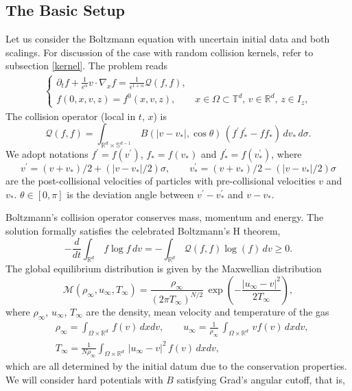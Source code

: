 \documentclass[final,onefignum,onetabnum]{siamart171218}
\begin{document}
\subsection{The Basic Setup}
\label{Section2}
Let us consider the Boltzmann equation with uncertain initial data and both scalings.
For discussion of the case with random collision kernels, refer to subsection \ref{kernel}. 
The problem reads
\begin{align}
\label{BP}
\left\{
\begin{array}{l}
\displaystyle \partial_t f + \frac{1}{\epsilon^\alpha} v\cdot\nabla_x f =\frac{1}{\epsilon^{1+\alpha}}\mathcal Q(f,f), \\[4pt]
\displaystyle  f(0,x,v,z)=f^0(x,v,z), \qquad x\in\Omega\subset\mathbb T^d,  \, v\in \mathbb R^d,  \, z\in I_z,
\end{array}\right.
\end{align}
The collision operator (local in $t$, $x$) is
$$\mathcal Q(f,f) = \int_{\mathbb R^d\times{\mathbb S^{d-1}}}\, B(|v-v_{\ast}|,  \cos\theta)\, (f^{\prime}f_{\ast}^{\prime}- f f_{\ast})\,
dv_{\ast}\, d{\sigma}. $$
We adopt notations $f^{\prime}=f(v^{\prime})$, $f_{\ast}=f(v_{\ast})$ and $f_{\ast}^{\prime}=f(v_{\ast}^{\prime})$, where
$$v^{\prime}= (v+v_{\ast})/2 + (|v-v_{\ast}|/2) \sigma, \qquad v_{\ast}^{\prime} = (v+v_{\ast})/2 - (|v-v_{\ast}|/2)\sigma$$
are the post-collisional velocities of particles with pre-collisional velocities $v$ and $v_{\ast}$.
$\theta\in[0,\pi]$ is the deviation angle between $v^{\prime}-v_{\ast}^{\prime}$ and $v-v_{\ast}$.

Boltzmann's collision operator conserves mass, momentum and energy. The solution formally satisfies the celebrated Boltzmann's H theorem,
\begin{equation}\label{H}-\frac{d}{dt}\int_{\mathbb R^d}\, f \log f \, dv= -\int_{\mathbb R^d}\, \mathcal Q(f,f) \log(f)\, dv\geq 0. \end{equation}
The global equilibrium distribution is given by the Maxwellian distribution
\begin{equation}\label{Max}\mathcal M(\rho_{\infty}, u_{\infty}, T_{\infty}) = \frac{\rho_{\infty}}{(2\pi T_{\infty})^{N/2}}\, \exp\left(-\frac{|u_{\infty}-v|^2}{2T_{\infty}}\right), \end{equation}
where $\rho_{\infty}$, $u_{\infty}$, $T_{\infty}$ are the density, mean velocity and temperature of the gas
\begin{align*}
&\displaystyle \rho_{\infty} = \int_{\Omega\times{\mathbb R^d}}\, f(v)\, dxdv, \qquad
u_{\infty} = \frac{1}{\rho_{\infty}}\, \int_{\Omega\times{\mathbb R^d}}\, vf(v)\, dxdv, \\[2pt]
&\displaystyle T_{\infty} = \frac{1}{N\rho_{\infty}}\int_{\Omega\times{\mathbb R^d}}\, |u_{\infty}-v|^2\, f(v)\, dxdv,
\end{align*}
which are all determined by the initial datum due to the conservation properties.
We will consider hard potentials with $B$ satisfying Grad's angular cutoff, that is,
\\[1pt]
\end{document}
